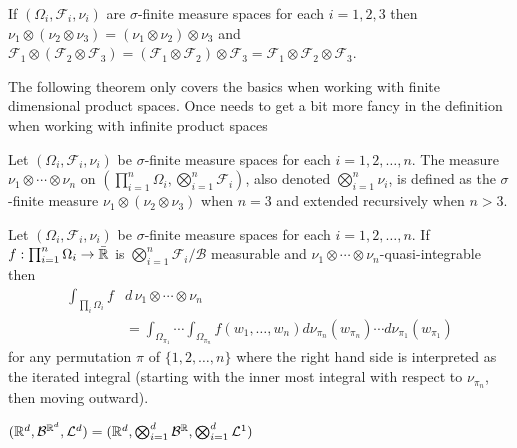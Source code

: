 \begin{theorem}
If $(\Omega_i,\mathcal F_i,\nu_i)$ are $\sigma$-finite measure spaces for each $i=1,2, 3$ then
$\nu_1\otimes (\nu_2\otimes\nu_3) = (\nu_1\otimes \nu_2)\otimes\nu_3$ and
\mbox{$\mathcal F_1\otimes (\mathcal F_2\otimes\mathcal F_3) = (\mathcal F_1\otimes \mathcal F_2)\otimes\mathcal F_3=\mathcal F_1\otimes \mathcal F_2\otimes\mathcal F_3$}.
\end{theorem}


The following theorem only covers the basics when working with finite dimensional product spaces. Once needs to get a bit more fancy in the definition when working with infinite product spaces

\begin{definition}
\label{def: Product measure of higher order}
Let $(\Omega_i,\mathcal F_i,\nu_i)$ be $\sigma$-finite measure spaces for each $i=1,2,\ldots, n$. The measure $\nu_1\otimes \cdots \otimes \nu_n$ on $(\prod_{i=1}^n \Omega_i, \bigotimes_{i=1}^n \mathcal F_i)$, also denoted $\bigotimes_{i=1}^n  \nu_i$, is defined as the $\sigma$-finite measure $\nu_1\otimes (\nu_2\otimes\nu_3)$ when $n=3$ and extended recursively when $n>3$.
\end{definition}





\begin{theorem}
Let $(\Omega_i,\mathcal F_i,\nu_i)$ be $\sigma$-finite measure spaces for each $i=1,2,\ldots, n$.
If $f:\prod_{i=1}^n \Omega_i\rightarrow \bar{\Bbb R}$ is $\bigotimes_{i=1}^n \mathcal F_i/\mathcal B$ measurable and $\nu_1\!\!\otimes \cdots \otimes \!\nu_n$-quasi-integrable then
\begin{align*}
 \int_{\prod_{i}\!\Omega_i}\!\!\!f &d\,\nu_1 \!\otimes\cdots\otimes\!\nu_n \\
 &= \int_{\Omega_{\pi_1}}\!\!\!\!\!\!\!\cdots\! \int_{\Omega_{\pi_n}}\!\!\!\! f(w_1,\ldots, w_n) d\nu_{\pi_n}(w_{\pi_n})\cdots d\nu_{\pi_1}(w_{\pi_1})
\end{align*}
for any permutation $\pi$ of $\{1,2,\ldots, n \}$ where the right hand side is interpreted as the iterated integral (starting with the inner most integral with respect to $\nu_{\pi_n}$, then moving outward).
\end{theorem}


\begin{corollary}
$(\Bbb R^d, \mathcal B^{{\Bbb R}^d}, \mathcal L^d ) = (\Bbb R^d, \bigotimes_{i=1}^d \mathcal B^{{\Bbb R}}, \bigotimes_{i=1}^d \mathcal L^1)$
\end{corollary}



